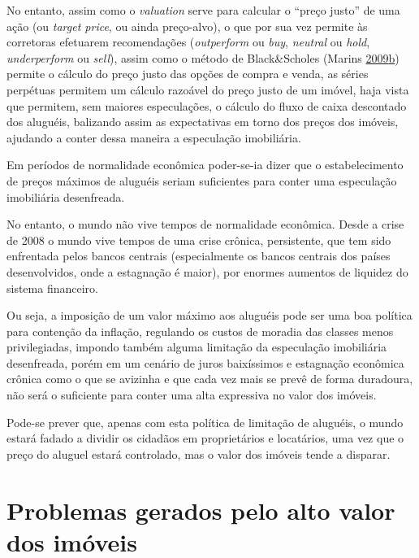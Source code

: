 \documentclass[
	12pt,				%
	oneside,			%
	a4paper,			%
	chapter=TITLE,		%
	section=TITLE,		%
	english,			%
	brazil				%
	]{abntex2}
\begin{document}
No entanto, assim como o \emph{valuation} serve para calcular o ``preço justo'' de uma
ação (ou \emph{target price}, ou ainda preço-alvo), o que por sua vez permite às
corretoras efetuarem recomendações (\emph{outperform} ou \emph{buy}, \emph{neutral} ou \emph{hold},
\emph{underperform} ou \emph{sell}), assim como o método de Black\&Scholes (Marins \protect\hyperlink{ref-marins2}{2009}\protect\hyperlink{ref-marins2}{b})
permite o cálculo do preço justo das opções de compra e venda, as séries
perpétuas permitem um cálculo razoável do preço justo de um imóvel, haja vista
que permitem, sem maiores especulações, o cálculo do fluxo de caixa descontado
dos aluguéis, balizando assim as expectativas em torno dos preços dos imóveis,
ajudando a conter dessa maneira a especulação imobiliária.

Em períodos de normalidade econômica poder-se-ia dizer que o estabelecimento
de preços máximos de aluguéis seriam suficientes para conter uma especulação
imobiliária desenfreada.

No entanto, o mundo não vive tempos de normalidade econômica. Desde a crise de
2008 o mundo vive tempos de uma crise crônica, persistente, que tem sido
enfrentada pelos bancos centrais (especialmente os bancos centrais dos países
desenvolvidos, onde a estagnação é maior), por enormes aumentos de liquidez
do sistema financeiro.

Ou seja, a imposição de um valor máximo aos aluguéis pode ser uma boa política
para contenção da inflação, regulando os custos de moradia das classes menos
privilegiadas, impondo também alguma limitação da especulação imobiliária
desenfreada, porém em um cenário de juros baixíssimos e estagnação econômica
crônica como o que se avizinha e que cada vez mais se prevê de forma duradoura,
não será o suficiente para conter uma alta expressiva no valor dos imóveis.

Pode-se prever que, apenas com esta política de limitação de aluguéis, o mundo
estará fadado a dividir os cidadãos em proprietários e locatários, uma vez que o
preço do aluguel estará controlado, mas o valor dos imóveis tende a disparar.

\hypertarget{problemas-gerados-pelo-alto-valor-dos-imuxf3veis}{%
\section{Problemas gerados pelo alto valor dos imóveis}\label{problemas-gerados-pelo-alto-valor-dos-imuxf3veis}}
\end{document}
